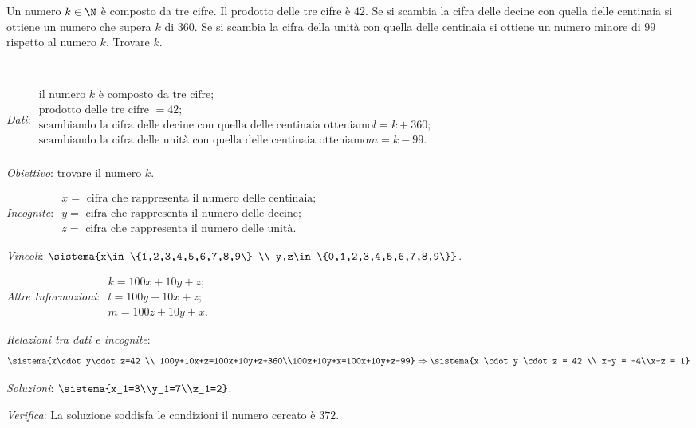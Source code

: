 \begin{problema}{}{}
Un numero \(k\in \N\) è composto da tre cifre. Il prodotto delle tre 
cifre è \(42\). 
Se si scambia la cifra delle decine con quella delle centinaia si 
ottiene un numero che supera \(k\) di \(360\). 
Se si scambia la cifra della unità con quella delle centinaia si ottiene 
un numero minore di \(99\) rispetto al numero \(k\). 
Trovare \(k\).
\end{problema}

\begin{soluzione}~

\vspace{-.5em}
\emph{Dati}: \(\begin{array}{l}
\text{il numero } k \text{ è composto da tre cifre};\\
\text{prodotto delle tre cifre } = 42;\\
\text{scambiando la cifra delle decine con quella delle centinaia 
otteniamo}l=k+360; \\
\text{scambiando la cifra delle unità con quella delle centinaia 
otteniamo} m=k-99.\\
\end{array}\)

\emph{Obiettivo}: trovare il numero \(k\).

\emph{Incognite}: \(\begin{array}{l}
x =\text{ cifra che rappresenta il numero delle centinaia;}\\
y=\text{ cifra che rappresenta il numero delle decine;}\\
z=\text{ cifra che rappresenta il numero delle unità.}
\end{array}\)

\emph{Vincoli}: 
\(\sistema{x\in \{1,2,3,4,5,6,7,8,9\} \\
y,z\in \{0,1,2,3,4,5,6,7,8,9\}}\).

\emph{Altre Informazioni}: \(\begin{array}{l}
k=100x+10y+z;\\
l=100y+10x+z;\\
m=100z+10y+x.
\end{array}\)

\emph{Relazioni tra dati e incognite}: 
\[ \sistema{x\cdot y\cdot z=42 \\
100y+10x+z=100x+10y+z+360\\100z+10y+x=100x+10y+z-99}\Rightarrow 
\sistema{x \cdot y \cdot z = 42 \\ x-y = -4\\x-z = 1}\]

\emph{Soluzioni}: 
\(\sistema{x_1=3\\y_1=7\\z_1=2}\).

\emph{Verifica}: La soluzione soddisfa le condizioni il numero cercato è 
\(372\).
\end{soluzione}

